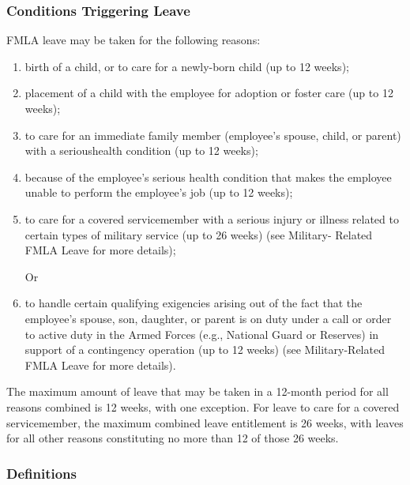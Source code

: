 \subsubsection{Conditions Triggering Leave}

FMLA leave may be taken for the following reasons:

\begin{enumerate} 	\item birth of a child, or to care for a newly-born child 	(up to 12 weeks);
	
	\item placement of a child with the employee for 	adoption or foster care (up to 12 weeks);
	
	\item to care for an immediate family member 	(employee's spouse, child, or parent) with a 	serioushealth condition (up to 12 weeks);
	
	\item because of the employee's serious health 	condition that makes the employee unable to 	perform the employee's job (up to 12 weeks);
	
	\item to care for a covered servicemember with a 	serious injury or illness related to certain types 	of military service (up to 26 weeks) (see Military- 	Related FMLA Leave for more details);
	
	Or
	
	\item to handle certain qualifying exigencies arising 	out of the fact that the employee's spouse, son, 	daughter, or parent is on duty under a call or 	order to active duty in the Armed Forces (e.g., 	National Guard or Reserves) in support of a 	contingency operation (up to 12 weeks) (see 	Military-Related FMLA Leave for more details). \end{enumerate}

The maximum amount of leave that may be taken in a 12-month period for all reasons combined is 12 weeks, with one exception. For leave to care for a covered servicemember, the maximum combined leave entitlement is 26 weeks, with leaves for all other reasons constituting no more than 12 of those 26 weeks.

\subsubsection{Definitions}


